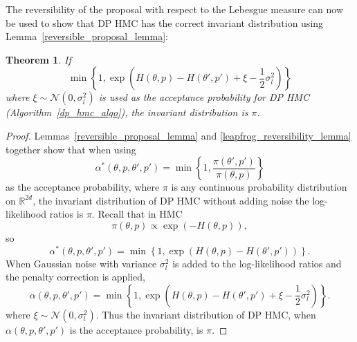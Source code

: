 \documentclass[english,twoside,openright]{HYgraduMLDS}
\newtheorem{theorem}[lemma]{Theorem}
\newcommand{\R}{\mathbb{R}}
\newcommand{\caln}{{\mathcal{N}}}
\begin{document}
The reversibility of the proposal with respect to the Lebesgue measure can now be
used to show that DP HMC has the correct invariant
distribution using Lemma~\ref{reversible_proposal_lemma}:
\begin{theorem}\label{dp_hmc_invariant_theorem}
  If
  \[
    \min\left\{1, \exp\left(H(\theta, p) - H(\theta', p')
        + \xi - \frac{1}{2}\sigma_{l}^{2}\right)\right\}
  \]
  where \(\xi\sim \caln(0, \sigma_{l}^{2})\)
  is used as the acceptance probability for DP HMC (Algorithm~\ref{dp_hmc_algo}),
  the invariant distribution is \(\pi\).
\end{theorem}
\begin{proof}
Lemmas~\ref{reversible_proposal_lemma} and \ref{leapfrog_reversibility_lemma}
together show that when using
\[
  \alpha^{*}(\theta, p, \theta', p')
  = \min\left\{1, \frac{\pi(\theta', p')}{\pi(\theta, p)}\right\}
\]
as the acceptance probability, where \(\pi\) is any continuous
probability distribution on \(\R^{2d}\), the invariant distribution
of DP HMC without adding noise the log-likelihood ratios is \(\pi\).
Recall that in HMC
\[
  \pi(\theta, p) \propto \exp(-H(\theta, p)),
\]
so
\[
  \alpha^{*}(\theta, p, \theta', p')
  = \min\left\{1, \exp\left(H(\theta, p) - H(\theta', p')\right)\right\}.
\]
When Gaussian noise with variance \(\sigma_{l}^{2}\) is added to the
log-likelihood ratios and the penalty correction is applied,
  \[
    \alpha(\theta, p, \theta', p')
    = \min\left\{1, \exp\left(H(\theta, p) - H(\theta', p')
        + \xi - \frac{1}{2}\sigma_{l}^{2}\right)\right\}.
  \]
  where \(\xi\sim \caln(0, \sigma_{l}^{2})\). Thus the invariant distribution
  of DP HMC, when \(\alpha(\theta, p, \theta', p')\) is the acceptance
  probability, is \(\pi\).
\end{proof}
\end{document}
